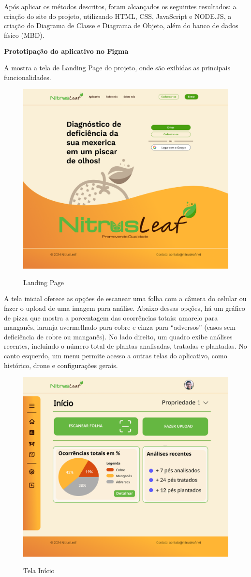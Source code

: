 Após aplicar os métodos descritos, foram alcançados os seguintes resultados: a criação do site do projeto, utilizando HTML, CSS, JavaScript e NODE.JS, a criação do Diagrama de Classe e Diagrama de Objeto, além do banco de dados físico (MBD).

\textbf{Prototipação do aplicativo no Figma}

A  mostra a tela de Landing Page do projeto, onde são exibidas as principais funcionalidades.

\begin{figure}[H]
    \centering
    \caption{Landing Page}
    \includegraphics[width=0.7\linewidth]{Illustrations/Landing-Page.png}
    \label{fig:landing-page}
\end{figure}

A tela inicial  oferece as opções de escanear uma folha com a câmera do celular ou fazer o upload de uma imagem para análise. Abaixo dessas opções, há um gráfico de pizza que mostra a porcentagem das ocorrências totais: amarelo para manganês, laranja-avermelhado para cobre e cinza para “adversos” (casos sem deficiência de cobre ou manganês). No lado direito, um quadro exibe análises recentes, incluindo o número total de plantas analisadas, tratadas e plantadas. No canto esquerdo, um menu permite acesso a outras telas do aplicativo, como histórico, drone e configurações gerais.

\begin{figure}[H]
\centering
\caption{Tela Início}
\includegraphics[width=0.7\linewidth]{Illustrations/tela-inicios.png}
\label{fig:tela-inicio}
\end{figure}

